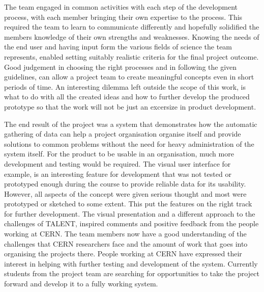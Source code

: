 \documentclass[english,12pt,a4paper,pdftex]{article}
\begin{document}
The team engaged in common activities with each step of the development process, with each member bringing their own expertise to the process. This required the team to learn to communicate differently and hopefully solidified the members knowledge of their own strengths and weaknesses. Knowing the needs of the end user and having input form the various fields of science the team represents, enabled setting suitably realistic criteria for the final project outcome. Good judgement in choosing the right processes and in following the given guidelines, can allow a project team to create meaningful concepts even in short periods of time. An interesting dilemma left outside the scope of this work, is what to do with all the created ideas and how to further develop the produced prototype so that the work will not be just an excersize in product development.

The end result of the project was a system that demonstrates how the automatic gathering of data can help a project organisation organise itself and provide solutions to common problems without the need for heavy administration of the system itself. For the product to be usable in an organisation, much more development and testing would be required. The visual user interface for example, is an interesting feature for development that was not tested or prototyped enough during the course to provide reliable data for its usability. However, all aspects of the concept were given serious thought and most were prototyped or sketched to some extent. This put the features on the right track for further development. The visual presentation and a different approach to the challenges of TALENT, inspired comments and positive feedback from the people working at CERN. The team members now have a good understanding of the challenges that CERN researchers face and the amount of work that goes into organising the projects there. People working at CERN have expressed their interest in helping with further testing and development of the system. Currently students from the project team are searching for opportunities to take the project forward and develop it to a fully working system.


\clearpage


\end{document}
